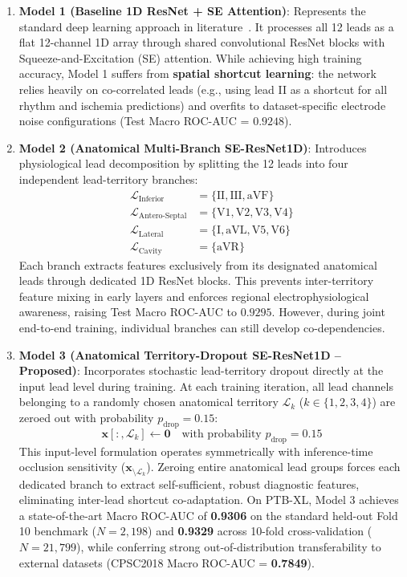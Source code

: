 \documentclass[12pt]{elsarticle}
\begin{document}
\begin{enumerate}
    \item \textbf{Model 1 (Baseline 1D ResNet + SE Attention)}: Represents the standard deep learning approach in literature~\cite{strodthoff2020deep}. It processes all 12 leads as a flat 12-channel 1D array through shared convolutional ResNet blocks with Squeeze-and-Excitation (SE) attention. While achieving high training accuracy, Model 1 suffers from \textbf{spatial shortcut learning}: the network relies heavily on co-correlated leads (e.g., using lead II as a shortcut for all rhythm and ischemia predictions) and overfits to dataset-specific electrode noise configurations (Test Macro ROC-AUC = $0.9248$).
    
    \item \textbf{Model 2 (Anatomical Multi-Branch SE-ResNet1D)}: Introduces physiological lead decomposition by splitting the 12 leads into four independent lead-territory branches:
    \begin{align}
    \mathcal{L}_{\text{Inferior}} &= \{\text{II}, \text{III}, \text{aVF}\} \\
    \mathcal{L}_{\text{Antero-Septal}} &= \{\text{V1}, \text{V2}, \text{V3}, \text{V4}\} \\
    \mathcal{L}_{\text{Lateral}} &= \{\text{I}, \text{aVL}, \text{V5}, \text{V6}\} \\
    \mathcal{L}_{\text{Cavity}} &= \{\text{aVR}\}
    \end{align}
    Each branch extracts features exclusively from its designated anatomical leads through dedicated 1D ResNet blocks. This prevents inter-territory feature mixing in early layers and enforces regional electrophysiological awareness, raising Test Macro ROC-AUC to $0.9295$. However, during joint end-to-end training, individual branches can still develop co-dependencies.
    
    \item \textbf{Model 3 (Anatomical Territory-Dropout SE-ResNet1D -- Proposed)}: Incorporates stochastic lead-territory dropout directly at the input lead level during training. At each training iteration, all lead channels belonging to a randomly chosen anatomical territory $\mathcal{L}_k$ ($k \in \{1, 2, 3, 4\}$) are zeroed out with probability $p_{\text{drop}} = 0.15$:
    \begin{equation}
    \mathbf{x}[:, \mathcal{L}_k] \leftarrow \mathbf{0} \quad \text{with probability } p_{\text{drop}} = 0.15
    \end{equation}
    This input-level formulation operates symmetrically with inference-time occlusion sensitivity ($\mathbf{x}_{\setminus \mathcal{L}_k}$). Zeroing entire anatomical lead groups forces each dedicated branch to extract self-sufficient, robust diagnostic features, eliminating inter-lead shortcut co-adaptation. On PTB-XL, Model 3 achieves a state-of-the-art Macro ROC-AUC of \textbf{0.9306} on the standard held-out Fold 10 benchmark ($N=2,198$) and \textbf{0.9329} across 10-fold cross-validation ($N=21,799$), while conferring strong out-of-distribution transferability to external datasets (CPSC2018 Macro ROC-AUC = \textbf{0.7849}).
\end{enumerate}
\end{document}
